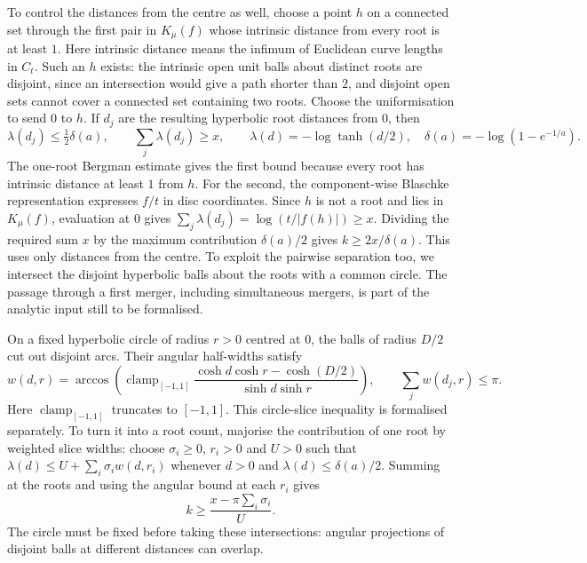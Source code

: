 \documentclass[11pt]{article}
\begin{document}
To control the distances from the centre as well, choose a point $h$
on a connected set through the first pair in $K_\mu(f)$ whose intrinsic
distance from every root is at least $1$. Here intrinsic distance means
the infimum of Euclidean curve lengths in $C_t$. Such an $h$ exists:
the intrinsic open unit balls about distinct roots are disjoint, since
an intersection would give a path shorter than $2$, and disjoint open
sets cannot cover a connected set containing two roots. Choose the
uniformisation to send $0$ to $h$. If $d_j$ are the resulting
hyperbolic root distances from $0$, then
\[
 \lambda(d_j)\le\tfrac12\delta(a),\qquad
 \sum_j\lambda(d_j)\ge x,\qquad
 \lambda(d)=-\log\tanh(d/2),\quad
 \delta(a)=-\log(1-e^{-1/a}).
\]
The one-root Bergman estimate gives the first bound because every root
has intrinsic distance at least $1$ from $h$. For the second, the component-wise Blaschke representation
\cite[(2.2)]{eks2010} expresses $f/t$ in disc coordinates.
Since $h$ is not a root and lies in $K_\mu(f)$, evaluation at $0$ gives
$\sum_j\lambda(d_j)=\log(t/|f(h)|)\ge x$.
Dividing the required sum $x$ by the maximum contribution
$\delta(a)/2$ gives $k\ge2x/\delta(a)$. This uses only distances
from the centre. To exploit the pairwise separation too, we intersect
the disjoint hyperbolic balls about the roots with a common circle.
The passage through a first merger, including simultaneous mergers, is
part of the analytic input still to be formalised.

\hypertarget{circle-packing-inputs}{}
On a fixed hyperbolic circle of radius $r>0$ centred at $0$, the balls
of radius $D/2$ cut out disjoint arcs. Their angular half-widths satisfy
\[
 w(d,r)=\arccos\!\left(\operatorname{clamp}_{[-1,1]}
 \frac{\cosh d\cosh r-\cosh(D/2)}{\sinh d\sinh r}\right),
 \qquad \sum_jw(d_j,r)\le\pi.
\]
Here $\operatorname{clamp}_{[-1,1]}$ truncates to $[-1,1]$.
This circle-slice inequality is formalised separately. To turn it into
a root count, majorise the contribution of one root by weighted slice
widths: choose $\sigma_i\ge0$, $r_i>0$ and $U>0$ such that
$\lambda(d)\le U+\sum_i\sigma_iw(d,r_i)$ whenever $d>0$ and
$\lambda(d)\le\delta(a)/2$. Summing at the roots and using the angular
bound at each $r_i$ gives
\begin{equation}\label{eq:short-packing}
 k\ge\frac{x-\pi\sum_i\sigma_i}{U}.
\end{equation}
The circle must be fixed before taking these intersections: angular
projections of disjoint balls at different distances can overlap.
\end{document}
